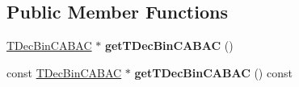 \subsection*{Public Member Functions}
\begin{DoxyCompactItemize}
\item 
\mbox{\label{class_t_dec_bin_c_a_b_a_c_a4d2b2f438a0636368a14e45759c6d953}} 
\hyperlink{class_t_dec_bin_c_a_b_a_c}{T\+Dec\+Bin\+C\+A\+B\+AC} $\ast$ {\bfseries get\+T\+Dec\+Bin\+C\+A\+B\+AC} ()
\item 
\mbox{\label{class_t_dec_bin_c_a_b_a_c_a7e8b4c6a7596f3a4cd55faeb98733255}} 
const \hyperlink{class_t_dec_bin_c_a_b_a_c}{T\+Dec\+Bin\+C\+A\+B\+AC} $\ast$ {\bfseries get\+T\+Dec\+Bin\+C\+A\+B\+AC} () const
\end{DoxyCompactItemize}
{\bf }\par
